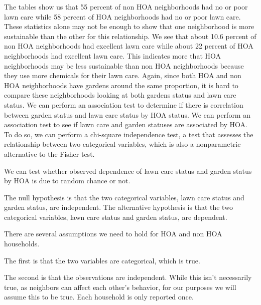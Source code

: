 \documentclass{article}
\begin{document}

The tables show us that 55 percent of non HOA neighborhoods had no or poor lawn care while 58 percent of HOA neighborhoods had no or poor lawn care. These statistics alone may not be enough to show that one neighborhood is more sustainable than the other for this relationship. We see that about 10.6 percent of non HOA neighborhoods had excellent lawn care while about 22 percent of HOA neighborhoods had excellent lawn care. This indicates more that HOA neighborhoods may be less sustainable than non HOA neighborhoods because they use more chemicals for their lawn care. Again, since both HOA and non HOA neighborhoods have gardens around the same proportion, it is hard to compare these neighborhoods looking at both gardens status and lawn care status.
\newline
We can perform an association test to determine if there is correlation between garden status and lawn care status by HOA status. 
\newline
We can perform an association test to see if lawn care and garden statuses are associated by HOA. To do so, we can perform a chi-square independence test, a test that assesses the relationship between two categorical variables, which is also a nonparametric alternative to the Fisher test.

We can test whether observed dependence of lawn care status and garden status by HOA is due to random chance or not. 

The null hypothesis is that the two categorical variables, lawn care status and garden status, are independent.
The alternative hypothesis is that the two categorical variables, lawn care status and garden status, are dependent. 

There are several assumptions we need to hold for HOA and non HOA households. 

The first is that the two variables are categorical, which is true.

The second is that the observations are independent. While this isn't necessarily true, as neighbors can affect each other's behavior, for our purposes we will assume this to be true. Each household is only reported once. 
\end{document}
